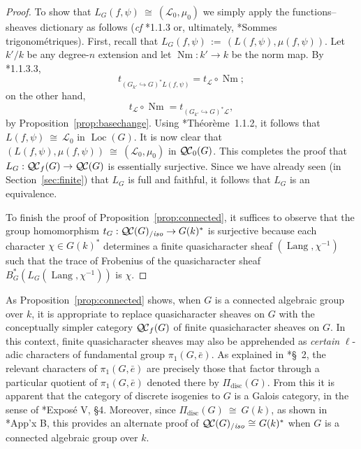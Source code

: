 \documentclass[11pt]{amsart}
\theoremstyle{plain}
\theoremstyle{definition}
\theoremstyle{remark}
\newcommand{\bFq}{\bar{k}}
\newcommand{\Fq}{k}
\DeclareMathOperator{\Gal}{Gal}
\DeclareMathOperator{\Nm}{Nm}
\newcommand{\ceq}{{\, :=\, }}
\newcommand{\iso}{{\ \cong\ }}
\newcommand{\qcs}[1]{{\mathcal{#1}}}
\newcommand{\QC}{{\mathcal{Q\hskip-0.8pt C}}}
\newcommand{\QCb}{{\QC_0}}
\newcommand{\QCf}{{\QC_f}}
\newcommand{\QCiso}[1]{\QC(#1)_{/\textit{iso}}}
\newcommand{\Lang}{{\operatorname{Lang}}}
\newcommand{\Loc}{{\operatorname{Loc}}}
\newcommand{\trFrob}[1]{t_{#1}}
\begin{document}
\begin{proof}
  To show that $L_G(f,\psi) \iso (\qcs{L}_0,\mu_0)$ we simply apply the functions--sheaves dictionary
  as follows ({\it cf} \cite{laumon:87a}*{1.1.3} or, ultimately, \cite{deligne:SGA4.5}*{Sommes trigonométriques}).
  First, recall that $L_G(f,\psi) \ceq (L(f,\psi), \mu(f,\psi))$.
  Let $k'/k$ be any degree-$n$ extension and let $\Nm : k'\to k$ be the norm map. 
  By \cite{laumon:87a}*{1.1.3.3}, 
  \[
  \trFrob{(G_{k'}\hookrightarrow G)^*L(f,\psi)} = \trFrob{\qcs{L}} \circ \Nm;
  \]
  on the other hand, 
  \[
  \trFrob{\qcs{L}} \circ \Nm = \trFrob{(G_{k'}\hookrightarrow G)^*\qcs{L}},
  \]
   by Proposition~\ref{prop:basechange}.
  Using \cite{laumon:87a}*{Th\'eor\`eme~1.1.2}, it follows that  $L(f,\psi) \iso \qcs{L}_0$ in $\Loc(G)$.
  It is now clear that $(L(f,\psi),\mu(f,\psi)) \iso (\qcs{L}_0,\mu_0)$ in $\QCb(G)$.
  This completes the proof that $L_G : \QCf(G) \to \QC(G)$ is essentially surjective.
  Since we have already seen (in Section~\ref{sec:finite}) that $L_G$ is full and faithful, 
  it follows that $L_G$ is an equivalence.
  
  To finish the proof of Proposition~\ref{prop:connected}, it suffices to observe that the group homomorphism
  $
  \trFrob{G} : \QCiso{G} \to G(\Fq)^*
  $
  is surjective because each character $\chi \in G(\Fq)^*$ determines a finite quasicharacter
  sheaf $(\Lang,\chi^{-1})$ such that the trace of Frobenius of the quasicharacter sheaf
  $B_G^* (L_G(\Lang,\chi^{-1}))$ is $\chi$.
\end{proof}

As Proposition~\ref{prop:connected} shows, 
when $G$ is a connected algebraic group over $\Fq$, 
it is appropriate to replace quasicharacter sheaves on $G$ 
with the conceptually simpler category $\QCf(G)$ of finite quasicharacter sheaves on $G$. 
In this context, finite quasicharacter sheaves may also be apprehended as
\emph{certain} $\ell$-adic characters of fundamental group $\pi_1(G,{\bar e})$. 
As explained in \cite{kamgarpour:09a}*{\S~2}, 
the relevant characters of $\pi_1(G,{\bar e})$ are precisely those 
that factor through a particular quotient of $\pi_1(G,{\bar e})$ 
denoted there by $\Pi_\text{disc}(G)$.
From this it is apparent that the category of discrete isogenies to $G$ is a Galois category,
in the sense of \cite{grothendieck:SGA1}*{Expos\'e V, \S 4}. Moreover, since $\Pi_\text{disc}(G) \iso G(\Fq)$,
as shown in \cite{kamgarpour:09a}*{App'x B}, this provides an alternate proof of
$\QCiso{G} \iso G(\Fq)^*$ when $G$ is a connected algebraic group over $\Fq$.
\end{document}
